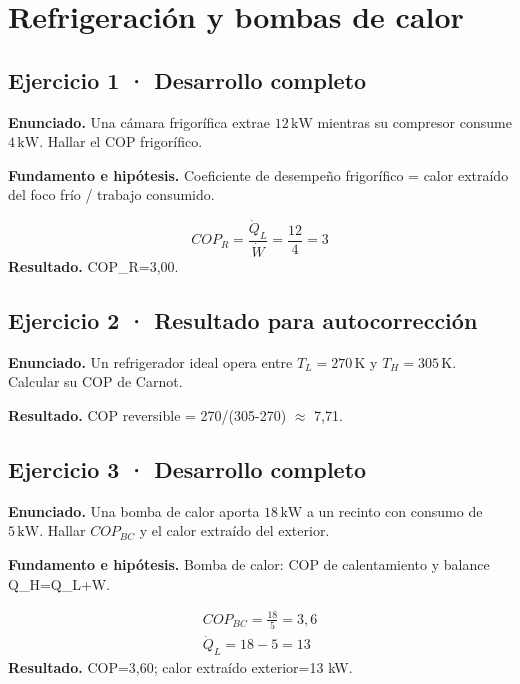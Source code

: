 \documentclass[11pt,a4paper]{article}
\begin{document}
\clearpage

\section{Refrigeración y bombas de calor}

\begin{center}\end{center}

\subsection*{Ejercicio 1 · Desarrollo completo}
\textbf{Enunciado.} Una cámara frigorífica extrae \(12\,\mathrm{kW}\) mientras su compresor consume \(4\,\mathrm{kW}\). Hallar el COP frigorífico.

\textbf{Fundamento e hipótesis.} Coeficiente de desempeño frigorífico = calor extraído del foco frío / trabajo consumido.

\[
COP_R=\frac{\dot Q_L}{\dot W}=\frac{12}{4}=3
\]
\textbf{Resultado.} COP\_R=3,00.


\subsection*{Ejercicio 2 · Resultado para autocorrección}
\textbf{Enunciado.} Un refrigerador ideal opera entre \(T_L=270\,\mathrm K\) y \(T_H=305\,\mathrm K\). Calcular su COP de Carnot.

\textbf{Resultado.} COP reversible = 270/(305-270) \ensuremath{\approx} 7,71.


\subsection*{Ejercicio 3 · Desarrollo completo}
\textbf{Enunciado.} Una bomba de calor aporta \(18\,\mathrm{kW}\) a un recinto con consumo de \(5\,\mathrm{kW}\). Hallar \(COP_{BC}\) y el calor extraído del exterior.

\textbf{Fundamento e hipótesis.} Bomba de calor: COP de calentamiento y balance Q\_H=Q\_L+W.

\[
\begin{gathered}
COP_{BC}=\frac{18}{5}=3{,}6\\\dot Q_L=18-5=13
\end{gathered}
\]
\textbf{Resultado.} COP=3,60; calor extraído exterior=13 kW.
\end{document}
